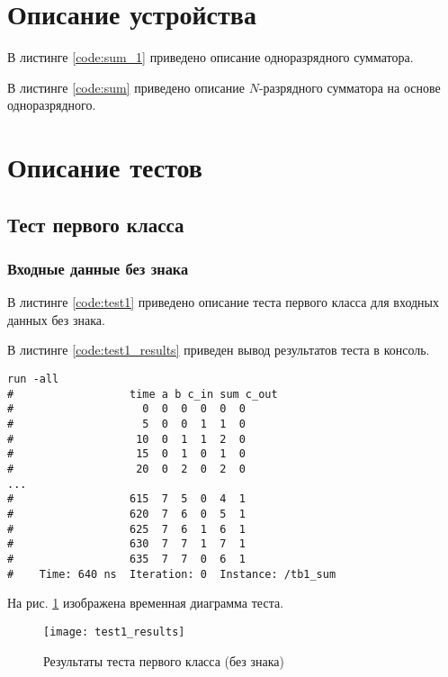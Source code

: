 \section{Описание устройства}

В листинге \ref{code:sum_1} приведено описание одноразрядного сумматора.


В листинге \ref{code:sum} приведено описание $N$-разрядного сумматора на основе одноразрядного.


\section{Описание тестов}
\label{sec:tests}

\subsection{Тест первого класса}

\subsubsection{Входные данные без знака}

В листинге \ref{code:test1} приведено описание теста первого класса для входных данных без знака.


В листинге \ref{code:test1_results} приведен вывод результатов теста в консоль.
\begin{lstlisting}[caption=Результаты теста первого класса (без знака), label=code:test1_results, style=console]
run -all
# 		           time a b c_in sum c_out
#                    0  0  0  0  0  0
#                    5  0  0  1  1  0
#                   10  0  1  1  2  0
#                   15  0  1  0  1  0
#                   20  0  2  0  2  0
...
#                  615  7  5  0  4  1
#                  620  7  6  0  5  1
#                  625  7  6  1  6  1
#                  630  7  7  1  7  1
#                  635  7  7  0  6  1
#    Time: 640 ns  Iteration: 0  Instance: /tb1_sum
\end{lstlisting}

На рис. \ref{fig:test1_results} изображена временная диаграмма теста.
\begin{figure}[H]
	\begin{center}
		\texttt{[image: test1\_results]}
		\caption{Результаты теста первого класса (без знака)}
		\label{fig:test1_results}
	\end{center}
\end{figure}

